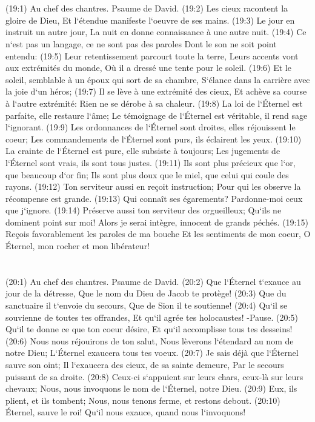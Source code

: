 \chapter{}

\verse (19:1) Au chef des chantres. Psaume de David. (19:2) Les cieux racontent la gloire de Dieu, Et l`étendue manifeste l`oeuvre de ses mains. 
\verse (19:3) Le jour en instruit un autre jour, La nuit en donne connaissance à une autre nuit. 
\verse (19:4) Ce n`est pas un langage, ce ne sont pas des paroles Dont le son ne soit point entendu: 
\verse (19:5) Leur retentissement parcourt toute la terre, Leurs accents vont aux extrémités du monde, Où il a dressé une tente pour le soleil. 
\verse (19:6) Et le soleil, semblable à un époux qui sort de sa chambre, S`élance dans la carrière avec la joie d`un héros; 
\verse (19:7) Il se lève à une extrémité des cieux, Et achève sa course à l`autre extrémité: Rien ne se dérobe à sa chaleur. 
\verse (19:8) La loi de l`Éternel est parfaite, elle restaure l`âme; Le témoignage de l`Éternel est véritable, il rend sage l`ignorant. 
\verse (19:9) Les ordonnances de l`Éternel sont droites, elles réjouissent le coeur; Les commandements de l`Éternel sont purs, ils éclairent les yeux. 
\verse (19:10) La crainte de l`Éternel est pure, elle subsiste à toujours; Les jugements de l`Éternel sont vrais, ils sont tous justes. 
\verse (19:11) Ils sont plus précieux que l`or, que beaucoup d`or fin; Ils sont plus doux que le miel, que celui qui coule des rayons. 
\verse (19:12) Ton serviteur aussi en reçoit instruction; Pour qui les observe la récompense est grande. 
\verse (19:13) Qui connaît ses égarements? Pardonne-moi ceux que j`ignore. 
\verse (19:14) Préserve aussi ton serviteur des orgueilleux; Qu`ils ne dominent point sur moi! Alors je serai intègre, innocent de grands péchés. 
\verse (19:15) Reçois favorablement les paroles de ma bouche Et les sentiments de mon coeur, O Éternel, mon rocher et mon libérateur! 

\chapter{}

\verse (20:1) Au chef des chantres. Psaume de David. (20:2) Que l`Éternel t`exauce au jour de la détresse, Que le nom du Dieu de Jacob te protège! 
\verse (20:3) Que du sanctuaire il t`envoie du secours, Que de Sion il te soutienne! 
\verse (20:4) Qu`il se souvienne de toutes tes offrandes, Et qu`il agrée tes holocaustes! -Pause. 
\verse (20:5) Qu`il te donne ce que ton coeur désire, Et qu`il accomplisse tous tes desseins! 
\verse (20:6) Nous nous réjouirons de ton salut, Nous lèverons l`étendard au nom de notre Dieu; L`Éternel exaucera tous tes voeux. 
\verse (20:7) Je sais déjà que l`Éternel sauve son oint; Il l`exaucera des cieux, de sa sainte demeure, Par le secours puissant de sa droite. 
\verse (20:8) Ceux-ci s`appuient sur leurs chars, ceux-là sur leurs chevaux; Nous, nous invoquons le nom de l`Éternel, notre Dieu. 
\verse (20:9) Eux, ils plient, et ils tombent; Nous, nous tenons ferme, et restons debout. 
\verse (20:10) Éternel, sauve le roi! Qu`il nous exauce, quand nous l`invoquons! 

